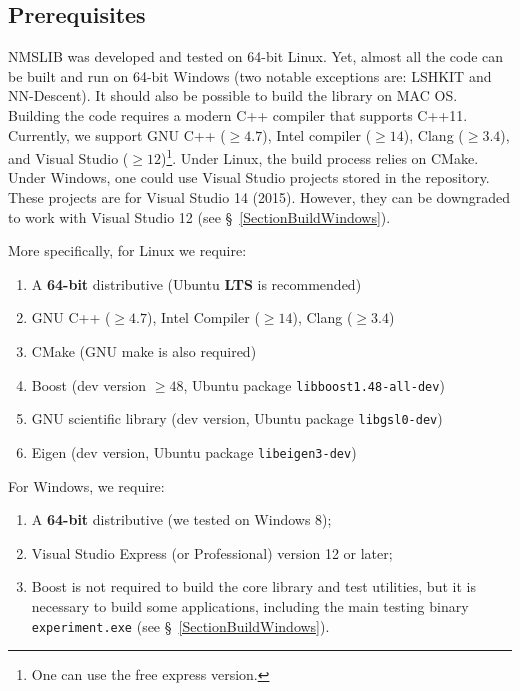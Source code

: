 \documentclass[runningheads,a4paper]{llncs}
\newcommand{\ttt}[1]{\texttt{#1}}
\begin{document}
{\subsection{Prerequisites}
NMSLIB was developed and tested on 64-bit Linux.
Yet, almost all the code can be built and run on 64-bit Windows (two notable exceptions are: LSHKIT and NN-Descent).
It should also be possible to build the library on MAC OS.
Building the code requires a modern C++ compiler that supports \mbox{C++11}.
Currently, we support GNU C++ ($\ge4.7$), Intel compiler ($\ge14$), 
Clang ($\ge3.4$), 
and Visual Studio ($\ge12$)\footnote{One can use the free express version.}.
Under Linux, the build process relies on CMake. 
Under Windows, one could use Visual Studio projects stored in the repository.
These projects are for Visual Studio 14 (2015). 
However, they can be downgraded to work with Visual Studio 12 (see \S~\ref{SectionBuildWindows}).


More specifically, for Linux we require:
\begin{enumerate}
\item A \textbf{64-bit} distributive (Ubuntu \textbf{LTS} is recommended)
\item GNU C++ ($\ge4.7$), Intel Compiler ($\ge14$), Clang ($\ge3.4$)
\item CMake (GNU make is also required)
\item Boost (dev version $\ge48$, Ubuntu package \ttt{libboost1.48-all-dev})
\item GNU scientific library (dev version, Ubuntu package \ttt{libgsl0-dev})
\item Eigen (dev version, Ubuntu package \ttt{libeigen3-dev})
\end{enumerate}

For Windows, we require:
\begin{enumerate}
\item A \textbf{64-bit} distributive (we tested on Windows 8); 
\item Visual Studio Express (or Professional) version 12 or later;
\item Boost is not required to build the core library and test utilities, 
but it is necessary to build some applications,
including the main testing binary \ttt{experiment.exe} (see \S~\ref{SectionBuildWindows}). 
\end{enumerate}

}
\end{document}
